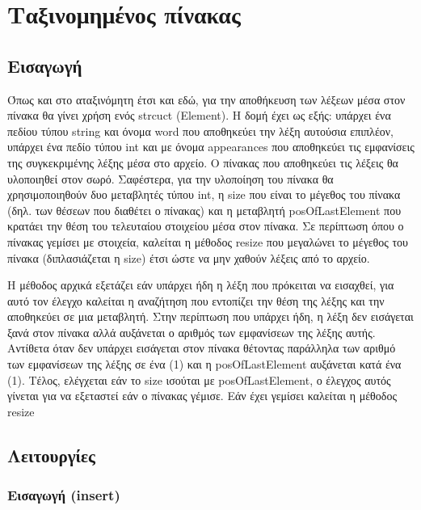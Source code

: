 \chapter{Ταξινομημένος πίνακας}

\section{Εισαγωγή}

Όπως και στο αταξινόμητη έτσι και εδώ, για την αποθήκευση των λέξεων μέσα στον πίνακα θα γίνει χρήση ενός strcuct (Element). Η δομή έχει ως εξής: υπάρχει ένα πεδίου τύπου string και όνομα word που αποθηκεύει την λέξη αυτούσια επιπλέον, υπάρχει ένα πεδίο τύπου int και με όνομα appearances που αποθηκεύει τις εμφανίσεις της συγκεκριμένης λέξης μέσα στο αρχείο. Ο πίνακας που αποθηκεύει τις λέξεις θα υλοποιηθεί στον σωρό. Σαφέστερα, για την υλοποίηση του πίνακα θα χρησιμοποιηθούν δυο μεταβλητές τύπου int, η size που είναι το μέγεθος του πίνακα (δηλ. των θέσεων που διαθέτει ο πίνακας) και η μεταβλητή posOfLastElement που κρατάει την θέση του τελευταίου στοιχείου μέσα στον πίνακα.  Σε περίπτωση όπου ο πίνακας γεμίσει με στοιχεία, καλείται η μέθοδος resize που μεγαλώνει το μέγεθος του πίνακα (διπλασιάζεται η size)  έτσι ώστε να μην χαθούν λέξεις από το αρχείο.

Η μέθοδος αρχικά εξετάζει εάν υπάρχει ήδη η λέξη που πρόκειται να εισαχθεί, για αυτό τον έλεγχο καλείται η αναζήτηση που εντοπίζει την θέση της λέξης και την αποθηκεύει σε μια μεταβλητή. Στην περίπτωση που υπάρχει ήδη, η λέξη δεν εισάγεται ξανά στον πίνακα αλλά αυξάνεται ο αριθμός των εμφανίσεων της λέξης αυτής. Αντίθετα όταν δεν υπάρχει εισάγεται στον πίνακα θέτοντας παράλληλα των αριθμό των εμφανίσεων της λέξης σε ένα (1) και η posOfLastElement αυξάνεται κατά ένα (1). Τέλος, ελέγχεται εάν το size ισούται με posOfLastElement, ο έλεγχος αυτός γίνεται για να εξεταστεί εάν ο πίνακας γέμισε. Εάν έχει γεμίσει καλείται η  μέθοδος resize

\section{Λειτουργίες}

\subsection{Εισαγωγή (insert)}

